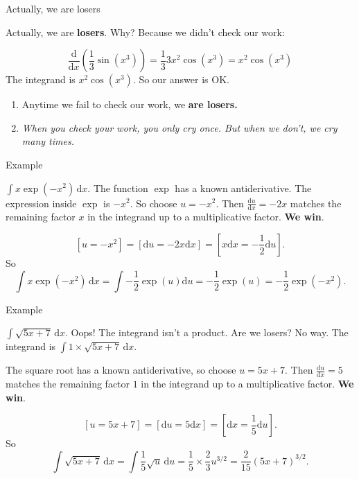 \documentclass[fleqn]{beamer}
\theoremstyle{definition}
\newenvironment{checklist}{
  \begin{enumerate}[\ding{51}]
    \addtolength{\itemsep}{-0.0\itemsep}}
  {\end{enumerate}}
\begin{document}
\begin{frame}{Actually, we are losers}

Actually, we are \textbf{losers}. Why?  Because we didn't check our work:

\[
   \frac{\mathrm{d}}{\mathrm{d} x} \left(  \frac{1}{3} \sin(x^3)   \right) =   \frac{1}{3} 3 x^2 \cos(x^3)   = x^2 \cos(x^3)
\]
The integrand is  \( x^2 \cos(x^3)\).  So our answer is OK.


\begin{checklist}

\item Anytime we fail to check our work, we \textbf{are losers.}

\item \emph{When you check your work, you only cry once. But when we don't,  we cry many times.}


\end{checklist}



\end{frame}
\begin{frame}{Example}

 \( \int x  \exp(-x^2) \, \mathrm{d} x \).   The function \(\exp\)  has a known antiderivative.  The expression inside \(\exp\) is \(-x^2\).  So choose \(u =-x^2\).   Then
\(\frac{\mathrm{d} u}{\mathrm{d} x} = -2 x \) matches the remaining factor  \(x\) in the integrand up to a multiplicative factor. \textbf{We win}.


\[
    [u = -x^2] = [\mathrm{d} u = -2 x  \mathrm{d} x] = \left[  x \mathrm{d} x = -  \frac{1}{2}  \mathrm{d} u \right].
\]
So
\[
  \int x  \exp(-x^2) \, \mathrm{d} x   = \int  - \frac{1}{2} \exp(u)  \mathrm{d} u = -  \frac{1}{2}   \exp(u)  =  -  \frac{1}{2}  \exp(-x^2) .
\]

\end{frame}

\begin{frame}{Example}

\( \int  \sqrt{5 x + 7}  \, \mathrm{d} x \).    Oops! The integrand isn't a product. Are we losers?  No way.   The integrand is \( \int 1 \times  \sqrt{5 x + 7}  \, \mathrm{d} x \). 

The square root has a known antiderivative, so choose \(u = 5 x + 7\). Then \(\frac{\mathrm{d} u}{\mathrm{d} x} = 5 \) matches the remaining factor  \(1\) in the integrand 
 up to a multiplicative factor. \textbf{We win}.
 
 
\[
    [u = 5 x + 7] = [\mathrm{d} u = 5   \mathrm{d} x] = \left[  \mathrm{d} x =  \frac{1}{5}  \mathrm{d} u \right].
\]
So
\[
   \int  \sqrt{5 x + 7}  \, \mathrm{d} x    =  \int \frac{1}{5} \sqrt{u} \, \mathrm{d} u =  \frac{1}{5}    \times  \frac{2}{3} u^{3/2} =  \frac{2}{15}  (5 x + 7)^{3/2}.
\]



\end{frame}
\end{document}

